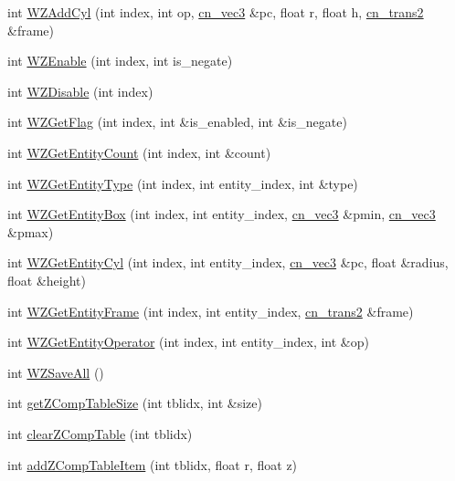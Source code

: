 \begin{DoxyCompactItemize}
\item 
int \hyperlink{classCUIApp_a499e134cf18fc918a83e0cd31fd56ba6}{W\-Z\-Add\-Cyl} (int index, int op, \hyperlink{structcn__vec3}{cn\-\_\-vec3} \&pc, float r, float h, \hyperlink{structcn__trans2}{cn\-\_\-trans2} \&frame)
\item 
int \hyperlink{classCUIApp_a9431ce97ebd52d159463c139c9dae083}{W\-Z\-Enable} (int index, int is\-\_\-negate)
\item 
int \hyperlink{classCUIApp_a2183043cadcc4afbebbd6afc10e57313}{W\-Z\-Disable} (int index)
\item 
int \hyperlink{classCUIApp_adc50b08e02682b5e3f1e002d31040e4c}{W\-Z\-Get\-Flag} (int index, int \&is\-\_\-enabled, int \&is\-\_\-negate)
\item 
int \hyperlink{classCUIApp_addb92c34a41a38e8688ec8c16da6396a}{W\-Z\-Get\-Entity\-Count} (int index, int \&count)
\item 
int \hyperlink{classCUIApp_aeb65cce62258e48239d713554e062794}{W\-Z\-Get\-Entity\-Type} (int index, int entity\-\_\-index, int \&type)
\item 
int \hyperlink{classCUIApp_a716eda397e3bec88da602c18b0e91556}{W\-Z\-Get\-Entity\-Box} (int index, int entity\-\_\-index, \hyperlink{structcn__vec3}{cn\-\_\-vec3} \&pmin, \hyperlink{structcn__vec3}{cn\-\_\-vec3} \&pmax)
\item 
int \hyperlink{classCUIApp_a72a74c0cbd2242374cf69b53a9c03e36}{W\-Z\-Get\-Entity\-Cyl} (int index, int entity\-\_\-index, \hyperlink{structcn__vec3}{cn\-\_\-vec3} \&pc, float \&radius, float \&height)
\item 
int \hyperlink{classCUIApp_a4e3483222d1296c96d04e46e28b03715}{W\-Z\-Get\-Entity\-Frame} (int index, int entity\-\_\-index, \hyperlink{structcn__trans2}{cn\-\_\-trans2} \&frame)
\item 
int \hyperlink{classCUIApp_ab90f33b53859cf92935b2e8b4618d747}{W\-Z\-Get\-Entity\-Operator} (int index, int entity\-\_\-index, int \&op)
\item 
int \hyperlink{classCUIApp_aacac360f0c6dd5a21ddc672a7ae8c52b}{W\-Z\-Save\-All} ()
\item 
int \hyperlink{classCUIApp_a2b36c2c000c8ac40267a32e5588874b9}{get\-Z\-Comp\-Table\-Size} (int tblidx, int \&size)
\item 
int \hyperlink{classCUIApp_a9c2d0d375c5ebfdd37bf8eb8c070248e}{clear\-Z\-Comp\-Table} (int tblidx)
\item 
int \hyperlink{classCUIApp_a4f1db639671b867b5d77821a2a9bbf59}{add\-Z\-Comp\-Table\-Item} (int tblidx, float r, float z)

\end{DoxyCompactItemize}
